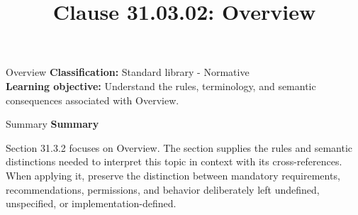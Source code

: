 \documentclass[10pt,letterpaper]{article}
\title{Clause 31.03.02: Overview}
\author{}
\date{}
\begin{document}
\maketitle
\begin{CornellOverviewBox}{Overview}
\textbf{Classification:} Standard library - Normative\\[2pt]
\textbf{Learning objective:} Understand the rules, terminology, and semantic consequences associated with Overview.
\end{CornellOverviewBox}\begin{CornellSummaryBox}{Summary}
{\sffamily\bfseries\color{Accent} Summary}\par\vspace{3pt}Section 31.3.2 focuses on Overview. The section supplies the rules and semantic distinctions needed to interpret this topic in context with its cross-references. When applying it, preserve the distinction between mandatory requirements, recommendations, permissions, and behavior deliberately left undefined, unspecified, or implementation-defined.
\end{CornellSummaryBox}
\end{document}
